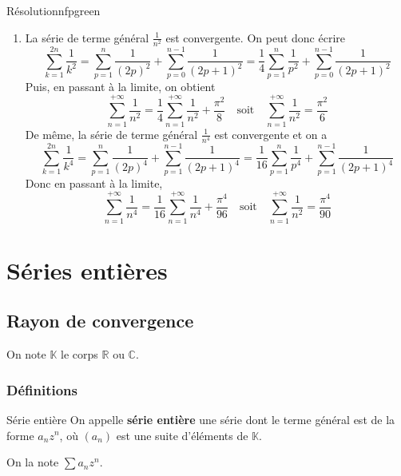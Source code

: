 \begin{omed}{Résolution}{nfpgreen}
\begin{enumerate}
\begin{align*}
                &=\frac{\pi^2}{4} + \frac{8}{\pi^2} \sum\limits_{p=0}^{+\infty} \frac{1}{(2p+1)^4}
            \end{align*} 
            Ce qui nous donne directement 
            \[ \sum\limits_{p=0}^{+\infty} \frac{1}{(2p+1)^4} = \frac{\pi^4}{96} \] 
            \item La série de terme général $\frac{1}{n^2}$ est convergente. On peut donc écrire 
            \[ \sum\limits_{k=1}^{2n} \frac{1}{k^2} = \sum\limits_{p=1}^{n} \frac{1}{(2p)^2} + \sum\limits_{p=0}^{n-1} \frac{1}{(2p+1)^2} = \frac{1}{4}\sum\limits_{p=1}^n \frac{1}{p^2} +  \sum\limits_{p=0}^{n-1} \frac{1}{(2p+1)^2} \] 
            Puis, en passant à la limite, on obtient 
            \[ \sum\limits_{n=1}^{+\infty} \frac{1}{n^2} = \frac{1}{4}\sum\limits_{n=1}^{+\infty} \frac{1}{n^2} + \frac{\pi^2}{8} \quad \text{soit} \quad \sum\limits_{n=1}^{+\infty} \frac{1}{n^2} = \frac{\pi^2}{6} \] 
            De même, la série de terme général $\frac{1}{n^4}$ est convergente et on a 
            \[ \sum\limits_{k=1}^{2n} \frac{1}{k^4} = \sum\limits_{p=1}^{n} \frac{1}{(2p)^4} + \sum\limits_{p=1}^{n-1} \frac{1}{(2p+1)^4} = \frac{1}{16} \sum\limits_{p=1}^{n} \frac{1}{p^4} +  \sum\limits_{p=1}^{n-1} \frac{1}{(2p+1)^4} \] 
            Donc en passant à la limite, 
            \[ \sum\limits_{n=1}^{+\infty} \frac{1}{n^4} = \frac{1}{16}\sum\limits_{n=1}^{+\infty} \frac{1}{n^4} + \frac{\pi^4}{96} \quad \text{soit} \quad \sum\limits_{n=1}^{+\infty} \frac{1}{n^2} = \frac{\pi^4}{90} \] 
        \end{enumerate}
    \end{omed}

\section{Séries entières}

\subsection{Rayon de convergence}

    On note $\mathbb{K}$ le corps $\mathbb{R}$ ou $\mathbb{C}$.

    \subsubsection{Définitions}

    \begin{defi}{Série entière}{}
        On appelle \textbf{série entière} une série dont le terme général est de la forme $a_n z^n$, où $(a_n)$ est une suite d’éléments de $\mathbb{K}$.

        On la note $\sum a_n z^n$.
    \end{defi}

